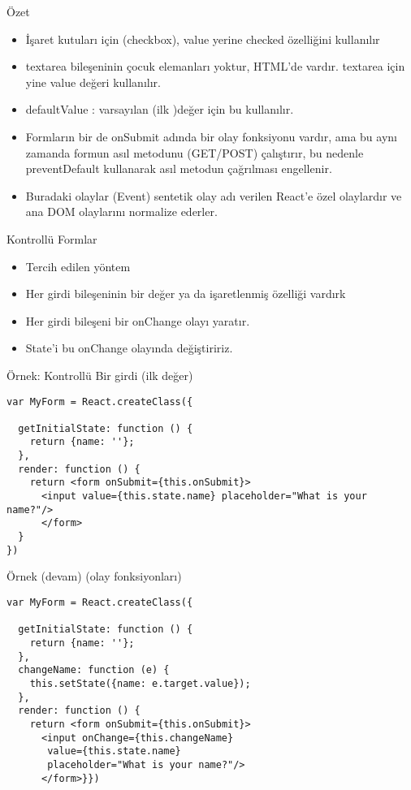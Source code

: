 \documentclass[presentation]{beamer}
\begin{document}
\begin{frame}[label=sec-7]{Özet}
\begin{itemize}
\item İşaret kutuları için (checkbox), value yerine checked özelliğini kullanılır
\item textarea bileşeninin çocuk elemanları yoktur, HTML'de vardır. textarea için
yine value değeri kullanılır.
\item defaultValue : varsayılan (ilk )değer için bu kullanılır.
\item Formların bir de onSubmit adında bir olay fonksiyonu vardır, ama bu aynı
zamanda formun asıl metodunu (GET/POST) çalıştırır, bu nedenle
preventDefault kullanarak asıl metodun çağrılması engellenir.
\item Buradaki olaylar (Event) sentetik olay adı verilen React'e özel olaylardır
ve ana DOM olaylarını normalize ederler.
\end{itemize}
\end{frame}

\begin{frame}[label=sec-8]{Kontrollü Formlar}
\begin{itemize}
\item Tercih edilen yöntem
\item Her girdi bileşeninin bir değer ya da işaretlenmiş özelliği vardırk
\item Her girdi bileşeni bir onChange olayı yaratır.
\item State'i bu onChange olayında değiştiririz.
\end{itemize}
\end{frame}

\begin{frame}[fragile,label=sec-9]{Örnek: Kontrollü Bir girdi (ilk değer)}
 \begin{verbatim}
var MyForm = React.createClass({

  getInitialState: function () {
    return {name: ''};
  },
  render: function () {
    return <form onSubmit={this.onSubmit}>
      <input value={this.state.name} placeholder="What is your name?"/>
      </form>
  }
})
\end{verbatim}
\end{frame}

\begin{frame}[fragile,label=sec-10]{Örnek (devam) (olay fonksiyonları)}
 \begin{verbatim}
var MyForm = React.createClass({

  getInitialState: function () {
    return {name: ''};
  },
  changeName: function (e) {
    this.setState({name: e.target.value});
  },
  render: function () {
    return <form onSubmit={this.onSubmit}>
      <input onChange={this.changeName}
       value={this.state.name}
       placeholder="What is your name?"/>
      </form>}})
\end{verbatim}
\end{frame}
\end{document}
